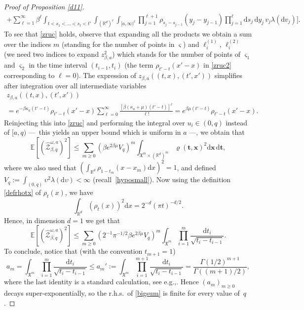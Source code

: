 \documentclass[11pt]{article}
\newcommand{\eg}{e.g.,\xspace}
\numberwithin{equation}{section}
\let\mathcal\mathscr
\theoremstyle{definition}
\newcommand{\bt}{\boldsymbol{t}}
\newcommand{\bx}{\boldsymbol{x}}
\newcommand{\dd}{\mathrm{d}}
\newcommand{\cZ}{{\ensuremath{\mathcal Z}} }
\newcommand{\bbE}{{\ensuremath{\mathbb E}} }
\newcommand{\bbR}{{\ensuremath{\mathbb R}} }
\let\gb\beta
\let\gG\Gamma
\let\ups\upsilon
\let\go\omega
\begin{document}
\begin{proof}[Proof of Proposition \ref{d11}]
\begin{multline}
+ \sum_{\ell=1}^{\infty} \beta^{\ell} \int_{ t< s_1<\dots<s_{\ell}<t' } \int_{(\bbR^d)^{\ell}} \int_{[a,\infty)^\ell} \prod_{j=1}^{\ell+1} \rho_{s_j-s_{j-1}} (y_j-y_{j-1}) \prod_{j=1}^{\ell}
\dd s_j\, \dd y_j\, v_j \lambda(\dd v_j) \bigg].
\end{multline}
To see that \eqref{zruc} holds, observe that expanding all the products we obtain a sum over the indices $m$ (standing for the number of points in $\varsigma$) and $\ell^{(1)}_i$, $\ell^{(2)}_i$ (we need two indices to expand $z^2_{\beta,a}$) which stands for
the number of points of $\varsigma_1$ and $\varsigma_2$ in the time interval $(t_{i-1},t_{i})$
(the term $\rho_{t'-t}(x'-x)$ in \eqref{zruc2} corresponding to $\ell=0$).
The expression of $z_{\beta,a} ((t,x), (t',x'))$ simplifies after integration over all intermediate variables\vspace*{-5pt}
\begin{multline}
z_{\beta,a} ((t,x), (t',x')) \\[-5pt]
= e^{ -\gb \kappa_a (t'-t)} \rho_{t'-t}(x'-x) \sum_{\ell=0}^{\infty} \frac{[\gb (\kappa_a +\mu) (t'-t)]^{\ell}}{ \ell !}= e^{ \gb \mu (t'-t)}
\rho_{t'-t}(x'-x).
\end{multline}
Reinjecting this into \eqref{zruc} and performing the integral over $u_i\in (0,q)$ instead of $[a,q)$ ---~this yields an upper bound which is uniform in $a$ ---, we obtain that
\begin{equation}
\label{eq:secondmomentZq}
\bbE \left[ (\hat \cZ^{\go,a}_{\beta,q})^2 \right]
\le \sum_{m \ge 0} \left(\gb e^{2\gb \mu} V_q \right)^{m} \int_{ \mathfrak{X}^m \times (\bbR^d)^m}
\varrho(\bt,\bx)^2
\dd \bx\, \dd \bt,
\end{equation}
where we also used that $(\int_{\bbR^d} \!\rho_{1-t_m}(x-x_m) \dd x)^2\!=\!1$, and defined \hbox{$V_q \!:=\! \int_{(0,q)}\! \ups^2 \lambda(\dd \ups)\!<\!\infty$} (recall~\eqref{hyposmall}).
Now using the definition \eqref{defrhotx} of $\rho_t(x)$, we have
\begin{equation}\label{lekalek}
\int_{\bbR^d}(\rho_{t}(x))^2\dd x
= 2^{-d}(\pi t)^{-d/2}.
\end{equation}
Hence, in dimension $d=1$ we get that
\begin{equation}\label{bigsum}
\bbE \left[ (\hat \cZ^{\go,a}_{\beta,q})^2 \right]\le \sum_{m \ge 0} \left(2^{-1}\pi^{-1/2} \beta e^{2\gb \mu} V_q \right)^{m} \int_{\mathfrak{X}^m} \prod_{i=1}^m
\frac{ \dd t_i}{\sqrt {t_i-t_{i-1}}}.
\end{equation}
To conclude, notice that (with the convention $t_{m+1}=1$)
\[
a_m= \int_{\mathfrak{X}^m} \prod_{i=1}^m
\frac{ \dd t_i}{\sqrt {t_i-t_{i-1}}}
\leq a_m' := \int_{\mathfrak{X}^m}
\prod_{i=1}^{m+1}
\frac{ \dd t_i}{\sqrt {t_i-t_{i-1}}}
= \frac{\gG(1/2)^{m+1} }{\gG((m+1)/2)},
\]
where the last identity is a standard calculation, see \eg \cite[Lem.\,A.3]{BL20_disc}.
Hence $(a_m)_{m\geq 0}$ decays super-exponentially,
so the r.h.s.\ of \eqref{bigsum} is finite for every value of~$q$.
\end{proof}
\end{document}
